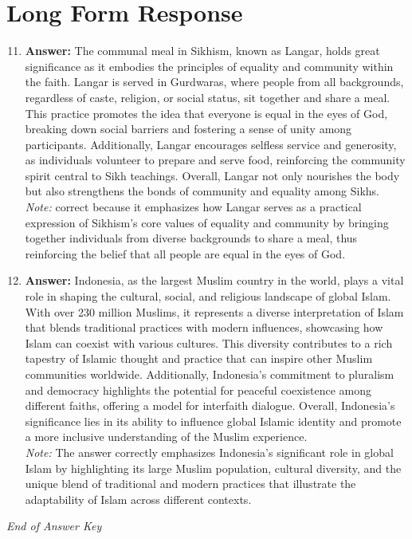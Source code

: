\documentclass[12pt]{article}
\begin{document}
\section*{Long Form Response}
\begin{enumerate}[label=\arabic*.]
\setcounter{enumi}{10}
\item \textbf{Answer:} The communal meal in Sikhism, known as Langar, holds great significance as it embodies the principles of equality and community within the faith. Langar is served in Gurdwaras, where people from all backgrounds, regardless of caste, religion, or social status, sit together and share a meal. This practice promotes the idea that everyone is equal in the eyes of God, breaking down social barriers and fostering a sense of unity among participants. Additionally, Langar encourages selfless service and generosity, as individuals volunteer to prepare and serve food, reinforcing the community spirit central to Sikh teachings. Overall, Langar not only nourishes the body but also strengthens the bonds of community and equality among Sikhs.
\\ \textit{Note:} correct because it emphasizes how Langar serves as a practical expression of Sikhism's core values of equality and community by bringing together individuals from diverse backgrounds to share a meal, thus reinforcing the belief that all people are equal in the eyes of God.
\item \textbf{Answer:} Indonesia, as the largest Muslim country in the world, plays a vital role in shaping the cultural, social, and religious landscape of global Islam. With over 230 million Muslims, it represents a diverse interpretation of Islam that blends traditional practices with modern influences, showcasing how Islam can coexist with various cultures. This diversity contributes to a rich tapestry of Islamic thought and practice that can inspire other Muslim communities worldwide. Additionally, Indonesia's commitment to pluralism and democracy highlights the potential for peaceful coexistence among different faiths, offering a model for interfaith dialogue. Overall, Indonesia's significance lies in its ability to influence global Islamic identity and promote a more inclusive understanding of the Muslim experience.
\\ \textit{Note:} The answer correctly emphasizes Indonesia's significant role in global Islam by highlighting its large Muslim population, cultural diversity, and the unique blend of traditional and modern practices that illustrate the adaptability of Islam across different contexts.
\end{enumerate}

\vfill
\noindent\textit{End of Answer Key}
\end{document}
